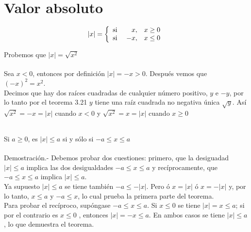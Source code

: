 \chapter{Valor absoluto}
\begin{tcolorbox}
\begin{def.}
\begin{equation}
|x| = \left\lbrace
\begin{array}{crr}
\textup{si } & x, & x\geq 0\\
\textup{si }& -x, & x \leq 0
\end{array}
\right.
\end{equation}
\end{def.}
\end{tcolorbox}
\begin{teo}
Probemos que $|x|=\sqrt{x^2}$\\\\
Sea $x<0$, entonces por definición $|x|=-x>0$. Después vemos que $(-x)^2=x^2$.\\
Decimos que hay dos raíces cuadradas de cualquier número positivo, $y$ e $-y$, por lo tanto por el teorema 3.21 \: $y$ tiene una raíz cuadrada no negativa única $\sqrt{y}$. Así $\sqrt{x^2}=-x=|x|$ cuando $x<0$ y $\sqrt{x^2}=x=|x|$ cuando $x\geq 0 $ \\\\
\end{teo}

\begin{teo}
Si $a\geq 0$, es \; $|x|\leq a$ \; si y sólo si \; $-a\leq x \leq a$\\\\
Demostración.- \; Debemos probar dos cuestiones: primero, que la desiguadad $|x|\leq a$ implica las dos desigualdades $-a \leq x \leq a$ y recíprocamente, que $-a \leq x \leq a$ implica $|x|\leq a$.\\ 
Ya supuesto $|x|\leq a$ se tiene también $-a \leq - |x|$. Pero ó \; $x=|x|$ \; ó \; $x = -|x|$ y, por lo tanto, $x\leq a$ \; y \; $-a \leq x$, lo cual prueba la primera parte del teorema.\\
Para probar el recíproco, supóngase $-a\leq x \leq a$. Si $x\leq 0$ se tiene $|x|=x\leq a$; si por el contrario es $x\leq 0$ , entonces $|x|=-x \leq a$. En ambos casos se tiene $|x|\leq a$, lo que demuestra el teorema.\\\\   
\end{teo}

